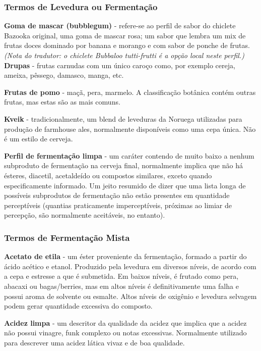\subsubsection*{Termos de Levedura ou Fermentação}
\textbf{Goma de mascar (bubblegum)} - refere-se ao perfil de sabor do chiclete Bazooka original, uma goma de mascar rosa; um sabor que lembra um mix de frutas doces dominado por banana e morango e com sabor de ponche de frutas.
\textit{(Nota do tradutor: o chiclete Bubbaloo tutti-frutti é a opção local neste perfil.)}\\

\textbf{Drupas} - frutas carnudas com um único caroço como, por exemplo cereja, ameixa, pêssego, damasco, manga, etc.

\textbf{Frutas de pomo} - maçã, pera, marmelo. A classificação botânica contém outras frutas, mas estas são as mais comuns.

\textbf{Kveik} - tradicionalmente, um blend de leveduras da Noruega utilizadas para produção de farmhouse ales, normalmente disponíveis como uma cepa única. Não é um estilo de cerveja.

\textbf{Perfil de fermentação limpa} - um caráter contendo de muito baixo a nenhum subproduto de fermentação na cerveja final, normalmente implica que não há ésteres, diacetil, acetaldeído ou compostos similares, exceto quando especificamente informado. Um jeito resumido de dizer que uma lista longa de possíveis subprodutos de fermentação não estão presentes em quantidade perceptíveis (quantias praticamente imperceptíveis, próximas ao limiar de percepção, são normalmente aceitáveis, no entanto).

\subsubsection*{Termos de Fermentação Mista}
\textbf{Acetato de etila} - um éster proveniente da fermentação, formado a partir do ácido acético e etanol. Produzido pela levedura em diversos níveis, de acordo com a cepa e estresse a que é submetida. Em baixos níveis, é frutado como pera, abacaxi ou bagas/berries, mas em altos níveis é definitivamente uma falha e possui aroma de solvente ou esmalte. Altos níveis de oxigênio e levedura selvagem podem gerar quantidade excessiva do composto.

\textbf{Acidez limpa} - um descritor da qualidade da acidez que implica que a acidez não possui vinagre, funk complexo ou notas excessivas. Normalmente utilizado para descrever uma acidez lática vivaz e de boa qualidade.

